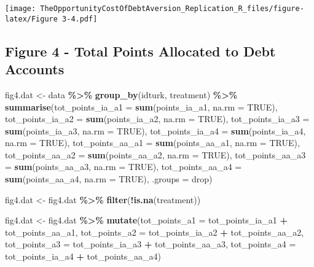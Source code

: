 \documentclass[
]{article}
\newenvironment{Shaded}{\begin{snugshade}}{\end{snugshade}}
\newcommand{\AttributeTok}[1]{\textcolor[rgb]{0.13,0.29,0.53}{#1}}
\newcommand{\ConstantTok}[1]{\textcolor[rgb]{0.56,0.35,0.01}{#1}}
\newcommand{\FunctionTok}[1]{\textcolor[rgb]{0.13,0.29,0.53}{\textbf{#1}}}
\newcommand{\NormalTok}[1]{#1}
\newcommand{\OtherTok}[1]{\textcolor[rgb]{0.56,0.35,0.01}{#1}}
\newcommand{\SpecialCharTok}[1]{\textcolor[rgb]{0.81,0.36,0.00}{\textbf{#1}}}
\newcommand{\StringTok}[1]{\textcolor[rgb]{0.31,0.60,0.02}{#1}}
\begin{document}
\texttt{[image: TheOpportunityCostOfDebtAversion\_Replication\_R\_files/figure-latex/Figure 3-4.pdf]}

\subsection{Figure 4 - Total Points Allocated to Debt
Accounts}\label{figure-4---total-points-allocated-to-debt-accounts}

\begin{Shaded}
\begin{Highlighting}[]
\NormalTok{fig4.dat }\OtherTok{\textless{}{-}}\NormalTok{ data }\SpecialCharTok{\%\textgreater{}\%}
  \FunctionTok{group\_by}\NormalTok{(idturk, treatment) }\SpecialCharTok{\%\textgreater{}\%}
  \FunctionTok{summarise}\NormalTok{(}\AttributeTok{tot\_points\_ia\_a1 =} \FunctionTok{sum}\NormalTok{(points\_ia\_a1, }\AttributeTok{na.rm =} \ConstantTok{TRUE}\NormalTok{),}
            \AttributeTok{tot\_points\_ia\_a2 =} \FunctionTok{sum}\NormalTok{(points\_ia\_a2, }\AttributeTok{na.rm =} \ConstantTok{TRUE}\NormalTok{),}
            \AttributeTok{tot\_points\_ia\_a3 =} \FunctionTok{sum}\NormalTok{(points\_ia\_a3, }\AttributeTok{na.rm =} \ConstantTok{TRUE}\NormalTok{),}
            \AttributeTok{tot\_points\_ia\_a4 =} \FunctionTok{sum}\NormalTok{(points\_ia\_a4, }\AttributeTok{na.rm =} \ConstantTok{TRUE}\NormalTok{),}
            \AttributeTok{tot\_points\_aa\_a1 =} \FunctionTok{sum}\NormalTok{(points\_aa\_a1, }\AttributeTok{na.rm =} \ConstantTok{TRUE}\NormalTok{),}
            \AttributeTok{tot\_points\_aa\_a2 =} \FunctionTok{sum}\NormalTok{(points\_aa\_a2, }\AttributeTok{na.rm =} \ConstantTok{TRUE}\NormalTok{),}
            \AttributeTok{tot\_points\_aa\_a3 =} \FunctionTok{sum}\NormalTok{(points\_aa\_a3, }\AttributeTok{na.rm =} \ConstantTok{TRUE}\NormalTok{),}
            \AttributeTok{tot\_points\_aa\_a4 =} \FunctionTok{sum}\NormalTok{(points\_aa\_a4, }\AttributeTok{na.rm =} \ConstantTok{TRUE}\NormalTok{),}
            \AttributeTok{.groups =} \StringTok{\textquotesingle{}drop\textquotesingle{}}\NormalTok{)}

\NormalTok{fig4.dat }\OtherTok{\textless{}{-}}\NormalTok{ fig4.dat }\SpecialCharTok{\%\textgreater{}\%} 
  \FunctionTok{filter}\NormalTok{(}\SpecialCharTok{!}\FunctionTok{is.na}\NormalTok{(treatment))}

\NormalTok{fig4.dat }\OtherTok{\textless{}{-}}\NormalTok{ fig4.dat }\SpecialCharTok{\%\textgreater{}\%}
  \FunctionTok{mutate}\NormalTok{(}\AttributeTok{tot\_points\_a1 =}\NormalTok{ tot\_points\_ia\_a1 }\SpecialCharTok{+}\NormalTok{ tot\_points\_aa\_a1,}
         \AttributeTok{tot\_points\_a2 =}\NormalTok{ tot\_points\_ia\_a2 }\SpecialCharTok{+}\NormalTok{ tot\_points\_aa\_a2,}
         \AttributeTok{tot\_points\_a3 =}\NormalTok{ tot\_points\_ia\_a3 }\SpecialCharTok{+}\NormalTok{ tot\_points\_aa\_a3,}
         \AttributeTok{tot\_points\_a4 =}\NormalTok{ tot\_points\_ia\_a4 }\SpecialCharTok{+}\NormalTok{ tot\_points\_aa\_a4)}


\end{Highlighting}
\end{Shaded}
\end{document}
